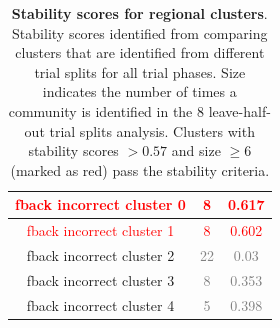 \begin{table}[ht]
\begin{minipage}{0.48\textwidth}
\begin{tabular}{c|c|c}
\textcolor{red}{fback incorrect cluster 0} & \textcolor{red}{8} & \textcolor{red}{0.617} \\ \hline
\textcolor{red}{fback incorrect cluster 1} & \textcolor{red}{8} & \textcolor{red}{0.602} \\ \hline
fback incorrect cluster 2 & \textcolor{gray}{22} & \textcolor{gray}{0.03} \\ \hline
fback incorrect cluster 3 & \textcolor{gray}{8} & \textcolor{gray}{0.353} \\ \hline
fback incorrect cluster 4 & \textcolor{gray}{5} & \textcolor{gray}{0.398} \\ \hline
\end{tabular}
\end{minipage}
\caption{\textbf{Stability scores for regional clusters}. Stability scores identified from comparing clusters that are identified from different trial splits for all trial phases. Size indicates the number of times a community is identified in the 8 leave-half-out trial splits analysis. Clusters with stability scores $>0.57$ and size $\geq6$ (marked as red) pass the stability criteria.}
\label{tab:cluster_stability}
\end{table}

\FloatBarrier


